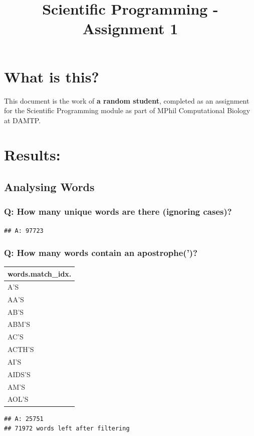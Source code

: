 \documentclass[a4paperpaper,]{article}
\title{Scientific Programming - Assignment 1}
\author{}
\date{}
\begin{document}
\maketitle

{
\setcounter{tocdepth}{3}
\tableofcontents
}
\section{What is this?}\label{what-is-this}

This document is the work of \textbf{a random student}, completed as an
assignment for the Scientific Programming module as part of MPhil
Computational Biology at DAMTP.

\section{Results:}\label{results}

\subsection{Analysing Words}\label{analysing-words}

\subsubsection{Q: How many unique words are there (ignoring
cases)?}\label{q-how-many-unique-words-are-there-ignoring-cases}

\begin{verbatim}
## A: 97723
\end{verbatim}

\subsubsection{Q: How many words contain an
apostrophe(')?}\label{q-how-many-words-contain-an-apostrophe}

\begin{longtable}[]{@{}l@{}}
\toprule
words.match\_idx.\tabularnewline
\midrule
\endhead
A'S\tabularnewline
AA'S\tabularnewline
AB'S\tabularnewline
ABM'S\tabularnewline
AC'S\tabularnewline
ACTH'S\tabularnewline
AI'S\tabularnewline
AIDS'S\tabularnewline
AM'S\tabularnewline
AOL'S\tabularnewline
\bottomrule
\end{longtable}

\begin{verbatim}
## A: 25751  
## 71972 words left after filtering
\end{verbatim}
\end{document}
